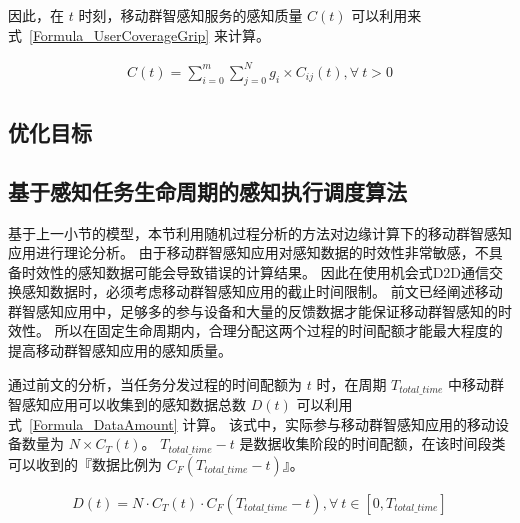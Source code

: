 因此，在 $t$ 时刻，移动群智感知服务的感知质量 $C(t)$ 可以利用来式~\eqref{Formula_UserCoverageGrip} 来计算。

\begin{equation}
  \label{Formula_UserCoverageGrip}
  \begin{gathered}
  C(t) = \sum^{m}_{i=0}\sum^{N}_{j=0} g_i \times C_{ij}(t), \forall \ t>0
  \end{gathered}
\end{equation}

\subsection{优化目标}



\subsection{基于感知任务生命周期的感知执行调度算法}

基于上一小节的模型，本节利用随机过程分析的方法对边缘计算下的移动群智感知应用进行理论分析。
由于移动群智感知应用对感知数据的时效性非常敏感，不具备时效性的感知数据可能会导致错误的计算结果。
因此在使用机会式D2D通信交换感知数据时，必须考虑移动群智感知应用的截止时间限制。
前文已经阐述移动群智感知应用中，足够多的参与设备和大量的反馈数据才能保证移动群智感知的时效性。
所以在固定生命周期内，合理分配这两个过程的时间配额才能最大程度的提高移动群智感知应用的感知质量。

通过前文的分析，当任务分发过程的时间配额为 $t$ 时，在周期 $T_{total\_time}$ 中移动群智感知应用可以收集到的感知数据总数 $D(t)$ 可以利用式~\eqref{Formula_DataAmount} 计算。
该式中，实际参与移动群智感知应用的移动设备数量为 $N\times C_T(t)$。
$T_{total\_time}-t$ 是数据收集阶段的时间配额，在该时间段类可以收到的『数据比例为 $C_F(T_{total\_time}-t)$』。

\begin{equation}
  \label{Formula_DataAmount}
  \begin{gathered}
  D(t) = N \cdot C_T(t) \cdot C_F(T_{total\_time}-t),\forall \ t \in [0, T_{total\_time}]
  \end{gathered}
\end{equation}

